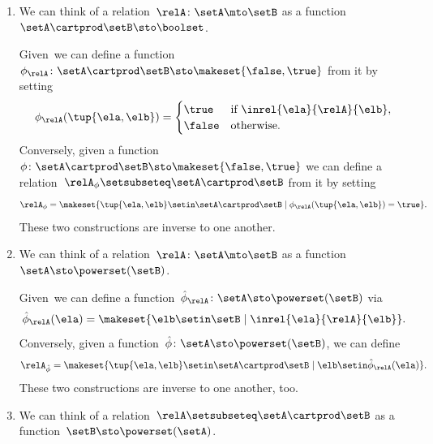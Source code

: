 \begin{enumerate}
    \item We can think of a relation~$\relA \colon \setA \mto\setB$ as a function~$\setA \cartprod \setB \sto \boolset$.

          Given~\relA we can define a function~$\phi_{\relA} \colon \setA \cartprod \setB \sto \makeset{ \false, \true }$ from it by setting
          \begin{equation}
              \phi_{\relA}(\tup{\ela, \elb}) =
              \begin{cases}
                  \true  & \text{if } \inrel{\ela}{\relA}{\elb}, \\
                  \false & \text{otherwise}.
              \end{cases}
          \end{equation}
          Conversely, given a function~$\phi\colon \setA \cartprod \setB \sto \makeset{ \false, \true }$ we can define a relation~$\relA_{\phi} \setsubseteq \setA \cartprod \setB$ from it by setting
          \begin{equation}
              \relA_{\phi} = \makeset{ \tup{\ela, \elb} \setin \setA \cartprod \setB \mid \phi_{\relA}(\tup{\ela, \elb}) = \true }.
          \end{equation}
          These two constructions are inverse to one another.

    \item We can think of a relation~$\relA \colon \setA \mto \setB$ as a function~$\setA  \sto \powerset (\setB)$.

          Given~\relA we can define a function~$\hat \phi_{\relA} \colon \setA \sto \powerset (\setB)$ via
          \begin{equation}
              \hat \phi_{\relA} (\ela) = \makeset{ \elb \setin \setB \mid \inrel{\ela}{\relA}{\elb}}.
          \end{equation}
          Conversely, given a function~$\hat \phi \colon \setA \sto \powerset (\setB)$, we can define
          \begin{equation}
              \relA_{\hat \phi} = \makeset{ \tup{\ela, \elb} \setin \setA \cartprod \setB \mid \elb \setin \hat \phi_{\relA}(\ela) }.
          \end{equation}
          These two constructions are inverse to one another, too.

    \item We can think of a relation~$\relA \setsubseteq \setA \cartprod \setB$ as a function~$\setB  \sto \powerset (\setA)$.


\end{enumerate}
